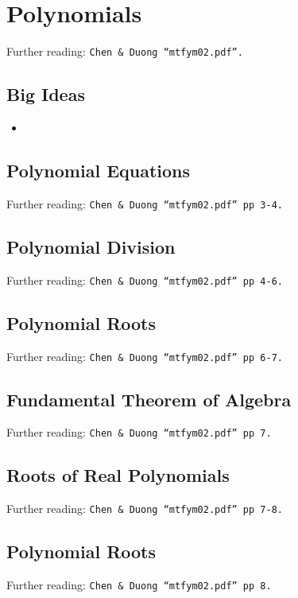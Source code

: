 \chapter{Polynomials}
\label{chap:P}
Further reading: \texttt{Chen \& Duong ``mtfym02.pdf''.}

\section{Big Ideas}
\label{sec:P Big Ideas}
\begin{itemize}
  \item 
\end{itemize}

\section{Polynomial Equations}
\label{sec:P Polynomial Equations}
Further reading: \texttt{Chen \& Duong ``mtfym02.pdf'' pp 3-4.}

\section{Polynomial Division}
\label{sec:P Polynomial Division}
Further reading: \texttt{Chen \& Duong ``mtfym02.pdf'' pp 4-6.}

\section{Polynomial Roots}
\label{sec:P Polynomial Root}
Further reading: \texttt{Chen \& Duong ``mtfym02.pdf'' pp 6-7.}

\section{Fundamental Theorem of Algebra}
\label{sec:P Fundamental Theorem of Algebra}
Further reading: \texttt{Chen \& Duong ``mtfym02.pdf'' pp 7.}

\section{Roots of Real Polynomials}
\label{sec:P Roots of Real Polynomial}
Further reading: \texttt{Chen \& Duong ``mtfym02.pdf'' pp 7-8.}

\section{Polynomial Roots}
\label{sec:P Polynomial Root}
Further reading: \texttt{Chen \& Duong ``mtfym02.pdf'' pp 8.}

